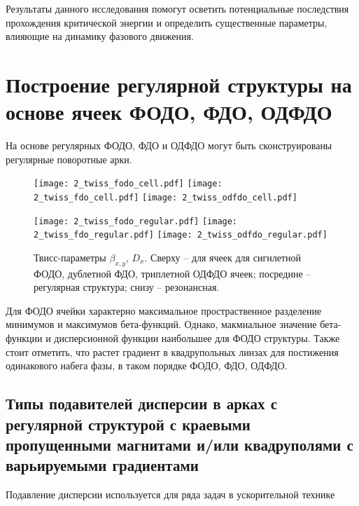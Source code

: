 \par Результаты данного исследования помогут осветить потенциальные последствия прохождения критической энергии и определить существенные параметры, влияющие на динамику фазового движения.

	\section{Построение регулярной структуры на основе ячеек ФОДО, ФДО, ОДФДО}\label{sec:transition_jump/FODO_FDO}

\par На основе регулярных ФОДО, ФДО и ОДФДО могут быть сконструированы регулярные поворотные арки.

\begin{figure} [h!]

   \texttt{[image: 2\_twiss\_fodo\_cell.pdf]}
   \texttt{[image: 2\_twiss\_fdo\_cell.pdf]}
   \texttt{[image: 2\_twiss\_odfdo\_cell.pdf]}

   \texttt{[image: 2\_twiss\_fodo\_regular.pdf]}
   \texttt{[image: 2\_twiss\_fdo\_regular.pdf]}
   \texttt{[image: 2\_twiss\_odfdo\_regular.pdf]}

   \caption{Твисс-параметры $\beta_{x,y}$, $D_{x}$. Сверху -- для ячеек для сигнлетной ФОДО, дублетной ФДО, триплетной ОДФДО ячеек; посредине -- регулярная структура; снизу -- резонансная.}
   \label{fig:fodo_fdo_odfdo}
\end{figure}

\par Для ФОДО ячейки характерно максимальное простраственное разделение минимумов и максимумов бета-функций. Однако, макмиальное значение бета-функции и дисперсионной функции наибольшее для ФОДО структуры. Также стоит отметить, что растет градиент в квадрупольных линзах для постижения одинакового набега фазы, в таком порядке ФОДО, ФДО, ОДФДО. 

	\subsection{Типы подавителей дисперсии в арках с регулярной структурой с краевыми пропущенными магнитами и/или квадруполями с варьируемыми градиентами}\label{sec:transition_jump/suppression}

\par Подавление дисперсии используется для ряда задач в ускорительной технике
	
